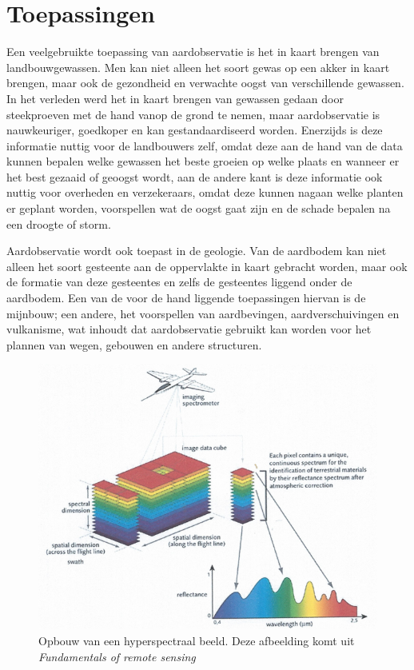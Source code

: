 \documentclass[12pt]{report}
\begin{document}
\section{Toepassingen}

Een veelgebruikte toepassing van aardobservatie is het in kaart brengen van landbouwgewassen\cite{fun}. Men kan niet alleen het soort gewas op een akker in kaart brengen, maar ook de gezondheid en verwachte oogst van verschillende gewassen. In het verleden werd het in kaart brengen van gewassen gedaan door steekproeven met de hand vanop de grond te nemen, maar aardobservatie is nauwkeuriger, goedkoper en kan gestandaardiseerd worden. Enerzijds is deze informatie nuttig voor de landbouwers zelf, omdat deze aan de hand van de data kunnen bepalen welke gewassen het beste groeien op welke plaats en wanneer er het best gezaaid of geoogst wordt, aan de andere kant is deze informatie ook nuttig voor overheden en verzekeraars, omdat deze kunnen nagaan welke planten er geplant worden, voorspellen wat de oogst gaat zijn en de schade  bepalen na een droogte of storm. 

Aardobservatie wordt ook toepast in de geologie. Van de aardbodem kan niet alleen het soort gesteente aan de oppervlakte in kaart gebracht worden, maar ook de formatie van deze gesteentes en zelfs de gesteentes liggend onder de aardbodem. Een van de voor de hand liggende toepassingen hiervan is de mijnbouw; een andere, het voorspellen van aardbevingen, aardverschuivingen en vulkanisme, wat inhoudt dat aardobservatie gebruikt kan worden voor het plannen van wegen, gebouwen en andere structuren. 

  
\begin{figure}
\includegraphics[width=\textwidth]{hyp.PNG}
\caption{Opbouw van een hyperspectraal beeld. Deze afbeelding komt uit \textit{Fundamentals of remote sensing\cite{fun}}}
\end{figure}
\end{document}
